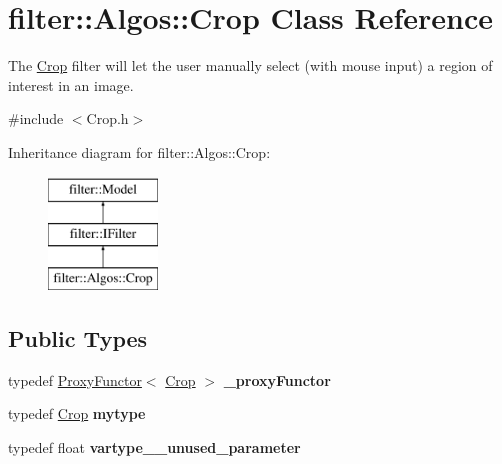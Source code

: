 \hypertarget{classfilter_1_1_algos_1_1_crop}{}\section{filter\+:\+:Algos\+:\+:Crop Class Reference}
\label{classfilter_1_1_algos_1_1_crop}


The \hyperlink{classfilter_1_1_algos_1_1_crop}{Crop} filter will let the user manually select (with mouse input) a region of interest in an image.  




{\ttfamily \#include $<$Crop.\+h$>$}

Inheritance diagram for filter\+:\+:Algos\+:\+:Crop\+:\begin{figure}[H]
\begin{center}
\leavevmode
\includegraphics[height=3.000000cm]{dd/d88/classfilter_1_1_algos_1_1_crop}
\end{center}
\end{figure}
\subsection*{Public Types}
\begin{DoxyCompactItemize}
\item 
\mbox{\label{classfilter_1_1_algos_1_1_crop_a95541eb3cc7f5595ce7730724fd2c6b5}} 
typedef \hyperlink{class_proxy_functor}{Proxy\+Functor}$<$ \hyperlink{classfilter_1_1_algos_1_1_crop}{Crop} $>$ {\bfseries \+\_\+proxy\+Functor}
\item 
\mbox{\label{classfilter_1_1_algos_1_1_crop_ab0d7dad1833eb9f0ad2aa7ac7c4a950d}} 
typedef \hyperlink{classfilter_1_1_algos_1_1_crop}{Crop} {\bfseries mytype}
\item 
\mbox{\label{classfilter_1_1_algos_1_1_crop_add9101538c1824755b8a57ee7e63b699}} 
typedef float {\bfseries vartype\+\_\+\+\_\+unused\+\_\+parameter}
\end{DoxyCompactItemize}
